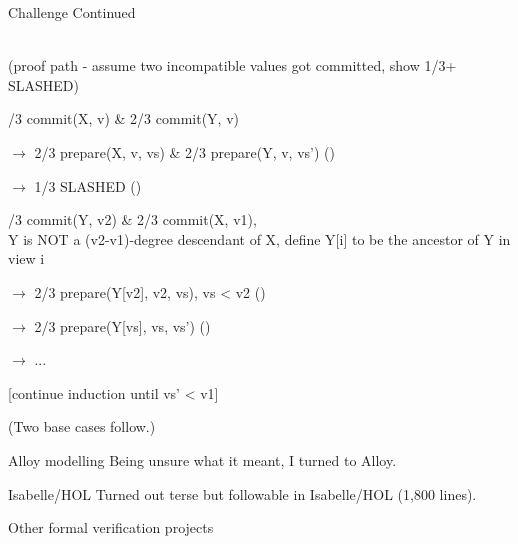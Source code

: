 \documentclass{beamer}
\begin{document}
\begin{frame}{Challenge Continued}

  \\ (proof path - assume two incompatible values got committed, show 1/3+ SLASHED)


/3 commit(X, v) \& 2/3 commit(Y, v)

$\rightarrow$ 2/3 prepare(X, v, vs) \& 2/3 prepare(Y, v, vs')  ()

$\rightarrow$ 1/3 SLASHED ()


/3 commit(Y, v2) \& 2/3 commit(X, v1),\\ Y is NOT a (v2-v1)-degree descendant of X, define Y[i] to be the ancestor of Y in view i

$\rightarrow$ 2/3 prepare(Y[v2], v2, vs), vs < v2 ()

$\rightarrow$ 2/3 prepare(Y[vs], vs, vs') ()

$\rightarrow$ ...

[continue induction until vs' < v1]

(Two base cases follow.)

\end{frame}

\begin{frame}{Alloy modelling}
Being unsure what it meant, I turned to Alloy.
\end{frame}


\begin{frame}{Isabelle/HOL}
\alert{Turned out terse but followable in Isabelle/HOL (1,800 lines).}

\end{frame}


\begin{frame}{Other formal verification projects}
\end{frame}
\end{document}

